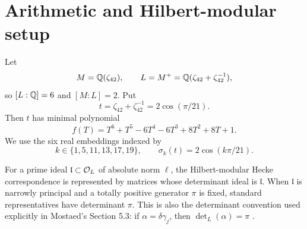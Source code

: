 \section{Arithmetic and Hilbert-modular setup}\label{sec:setup}
Let
\[
 M=\mathbb Q(\zeta_{42}),\qquad L=M^+=\mathbb Q(\zeta_{42}+\zeta_{42}^{-1}),
\]
so $[L:\mathbb Q]=6$ and $[M:L]=2$. Put
\[
 t=\zeta_{42}+\zeta_{42}^{-1}=2\cos(\pi/21).
\]
Then $t$ has minimal polynomial
\begin{equation}\label{eq:minpoly}
 f(T)=T^6+T^5-6T^4-6T^3+8T^2+8T+1.
\end{equation}
We use the six real embeddings indexed by
\[
 k\in\{1,5,11,13,17,19\},\qquad \sigma_k(t)=2\cos(k\pi/21).
\]

For a prime ideal $\mathfrak l\subset\mathcal O_L$ of absolute norm $\ell$, the Hilbert-modular Hecke correspondence is represented by matrices whose determinant ideal is $\mathfrak l$. When $\mathfrak l$ is narrowly principal and a totally positive generator $\pi$ is fixed, standard representatives have determinant $\pi$. This is also the determinant convention used explicitly in Mostaed's Section 5.3: if $\alpha=\delta\gamma_j$, then $\det_L(\alpha)=\pi$ \cite[Sec.~5.3]{Mostaed2026}.


